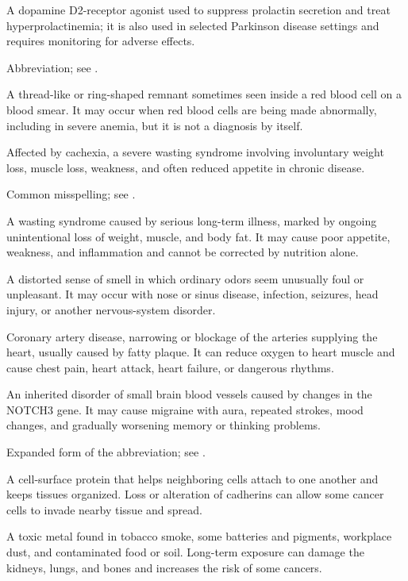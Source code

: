  A dopamine D2-receptor agonist used to suppress prolactin secretion and treat hyperprolactinemia; it is also used in selected Parkinson disease settings and requires monitoring for adverse effects.

 Abbreviation; see .

 A thread-like or ring-shaped remnant sometimes seen inside a red blood cell on a blood smear. It may occur when red blood cells are being made abnormally, including in severe anemia, but it is not a diagnosis by itself.

 Affected by cachexia, a severe wasting syndrome involving involuntary weight loss, muscle loss, weakness, and often reduced appetite in chronic disease.

 Common misspelling; see .

 A wasting syndrome caused by serious long-term illness, marked by ongoing unintentional loss of weight, muscle, and body fat. It may cause poor appetite, weakness, and inflammation and cannot be corrected by nutrition alone.

 A distorted sense of smell in which ordinary odors seem unusually foul or unpleasant. It may occur with nose or sinus disease, infection, seizures, head injury, or another nervous-system disorder.

 Coronary artery disease, narrowing or blockage of the arteries supplying the heart, usually caused by fatty plaque. It can reduce oxygen to heart muscle and cause chest pain, heart attack, heart failure, or dangerous rhythms.

 An inherited disorder of small brain blood vessels caused by changes in the NOTCH3 gene. It may cause migraine with aura, repeated strokes, mood changes, and gradually worsening memory or thinking problems.

 Expanded form of the abbreviation; see .

 A cell-surface protein that helps neighboring cells attach to one another and keeps tissues organized. Loss or alteration of cadherins can allow some cancer cells to invade nearby tissue and spread.

 A toxic metal found in tobacco smoke, some batteries and pigments, workplace dust, and contaminated food or soil. Long-term exposure can damage the kidneys, lungs, and bones and increases the risk of some cancers.


